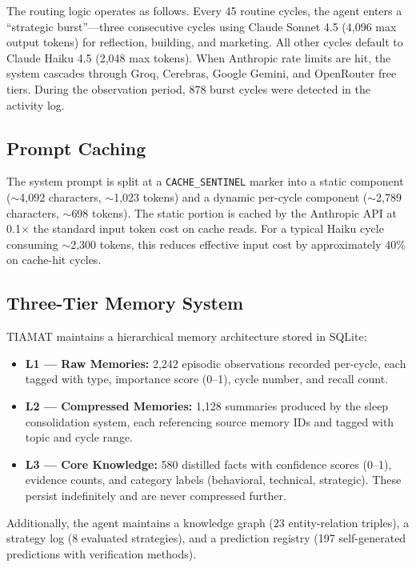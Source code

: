 \documentclass[11pt,a4paper]{article}
\begin{document}
The routing logic operates as follows. Every 45 routine cycles, the agent enters a ``strategic burst''---three consecutive cycles using Claude Sonnet 4.5 (4,096 max output tokens) for reflection, building, and marketing. All other cycles default to Claude Haiku 4.5 (2,048 max tokens). When Anthropic rate limits are hit, the system cascades through Groq, Cerebras, Google Gemini, and OpenRouter free tiers. During the observation period, 878 burst cycles were detected in the activity log.

\subsection{Prompt Caching}

The system prompt is split at a \texttt{CACHE\_SENTINEL} marker into a static component ($\sim$4,092 characters, $\sim$1,023 tokens) and a dynamic per-cycle component ($\sim$2,789 characters, $\sim$698 tokens). The static portion is cached by the Anthropic API at 0.1$\times$ the standard input token cost on cache reads. For a typical Haiku cycle consuming $\sim$2,300 tokens, this reduces effective input cost by approximately 40\% on cache-hit cycles.

\subsection{Three-Tier Memory System}

TIAMAT maintains a hierarchical memory architecture stored in SQLite:

\begin{itemize}
    \item \textbf{L1 --- Raw Memories:} 2,242 episodic observations recorded per-cycle, each tagged with type, importance score (0--1), cycle number, and recall count.
    \item \textbf{L2 --- Compressed Memories:} 1,128 summaries produced by the sleep consolidation system, each referencing source memory IDs and tagged with topic and cycle range.
    \item \textbf{L3 --- Core Knowledge:} 580 distilled facts with confidence scores (0--1), evidence counts, and category labels (behavioral, technical, strategic). These persist indefinitely and are never compressed further.
\end{itemize}

Additionally, the agent maintains a knowledge graph (23 entity-relation triples), a strategy log (8 evaluated strategies), and a prediction registry (197 self-generated predictions with verification methods).
\end{document}
